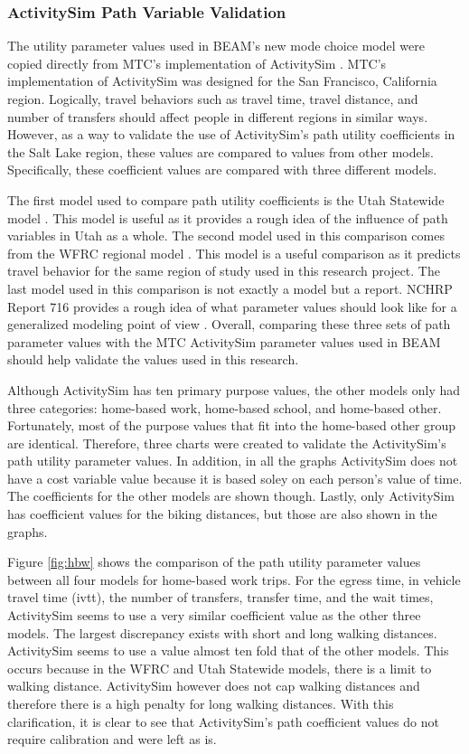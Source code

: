 \documentclass[3p, authoryear, review]{elsarticle} %
\begin{document}
\hypertarget{valid}{%
\subsubsection{ActivitySim Path Variable Validation}\label{valid}}

The utility parameter values used in BEAM's new mode choice model were copied directly from MTC's implementation of ActivitySim \citep{mtc12}. MTC's implementation of ActivitySim was designed for the San Francisco, California region. Logically, travel behaviors such as travel time, travel distance, and number of transfers should affect people in different regions in similar ways. However, as a way to validate the use of ActivitySim's path utility coefficients in the Salt Lake region, these values are compared to values from other models. Specifically, these coefficient values are compared with three different models.

The first model used to compare path utility coefficients is the Utah Statewide model \citep{utahstate}. This model is useful as it provides a rough idea of the influence of path variables in Utah as a whole. The second model used in this comparison comes from the WFRC regional model \citep{wfrc}. This model is a useful comparison as it predicts travel behavior for the same region of study used in this research project. The last model used in this comparison is not exactly a model but a report. NCHRP Report 716 provides a rough idea of what parameter values should look like for a generalized modeling point of view \citep{nchrp}. Overall, comparing these three sets of path parameter values with the MTC ActivitySim parameter values used in BEAM should help validate the values used in this research.

Although ActivitySim has ten primary purpose values, the other models only had three categories: home-based work, home-based school, and home-based other. Fortunately, most of the purpose values that fit into the home-based other group are identical. Therefore, three charts were created to validate the ActivitySim's path utility parameter values. In addition, in all the graphs ActivitySim does not have a cost variable value because it is based soley on each person's value of time. The coefficients for the other models are shown though. Lastly, only ActivitySim has coefficient values for the biking distances, but those are also shown in the graphs.

Figure \ref{fig:hbw} shows the comparison of the path utility parameter values between all four models for home-based work trips. For the egress time, in vehicle travel time (ivtt), the number of transfers, transfer time, and the wait times, ActivitySim seems to use a very similar coefficient value as the other three models. The largest discrepancy exists with short and long walking distances. ActivitySim seems to use a value almost ten fold that of the other models. This occurs because in the WFRC and Utah Statewide models, there is a limit to walking distance. ActivitySim however does not cap walking distances and therefore there is a high penalty for long walking distances. With this clarification, it is clear to see that ActivitySim's path coefficient values do not require calibration and were left as is.
\end{document}
